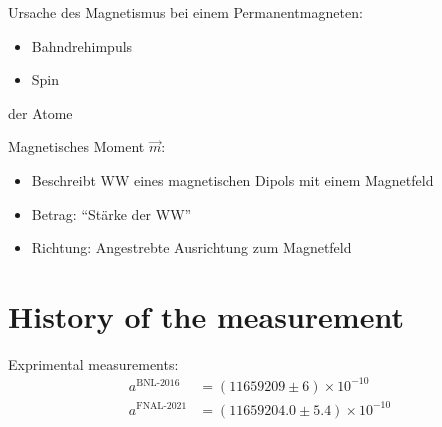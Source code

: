 \documentclass[12pt]{beamer}
\begin{document}
\begin{frame}{\insertsection}
  Ursache des Magnetismus bei einem Permanentmagneten:
  \begin{itemize}
  \item Bahndrehimpuls
  \item Spin
  \end{itemize}
  der Atome
\end{frame}

\begin{frame}{\insertsection}
  Magnetisches Moment $\vec{m}$:
  \begin{itemize}
  \item Beschreibt WW eines magnetischen Dipols mit einem Magnetfeld
  \item Betrag: "`Stärke der WW"'
  \item Richtung: Angestrebte Ausrichtung zum Magnetfeld
  \end{itemize}
\end{frame}


\section{History of the measurement}

\newcommand{\amuBNL}{11659209} %
\newcommand{\DamuBNL}{6}
\newcommand{\numamuBNL}{\num{\amuBNL}}

\newcommand{\amuFNAL}{11659204.0}
\newcommand{\DamuFNAL}{5.4}
\newcommand{\numamuFNAL}{\num{\amuFNAL}}

\begin{frame}{\insertsection}
  Exprimental measurements:
  \begin{align*}
    a^{\text{BNL-2016}} &= (\numamuBNL \pm \DamuBNL)\times 10^{-10} \\
    a^{\text{FNAL-2021}} &= (\numamuFNAL \pm \DamuFNAL)\times 10^{-10}
  \end{align*}
\end{frame}

\begin{frame}{\insertsection}
  \begin{center}
  \end{center}
\end{frame}
\end{document}

